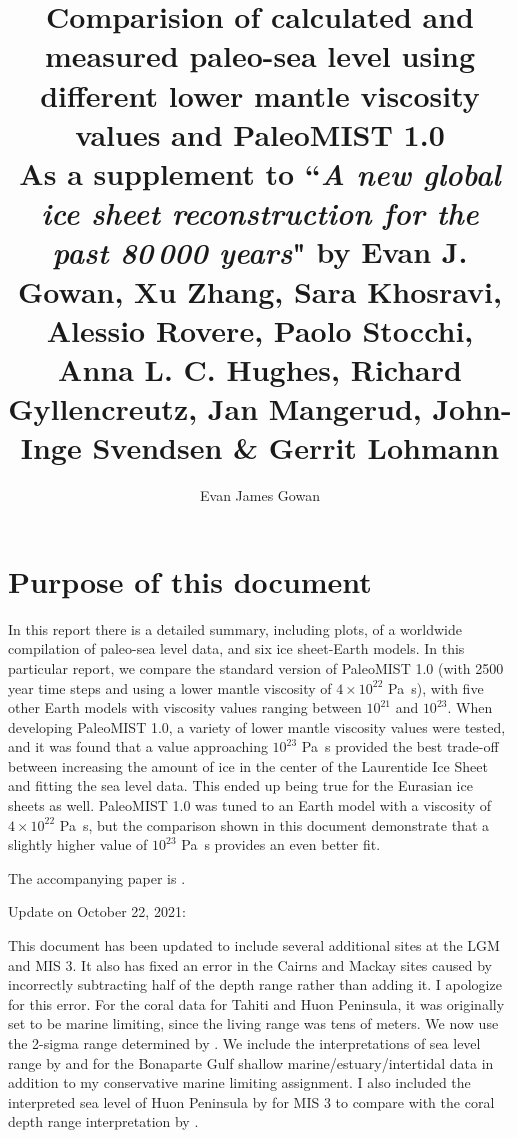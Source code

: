 \documentclass[a4paper,12pt]{article}
\begin{document}
\title{Comparision of calculated and measured paleo-sea level using different lower mantle viscosity values and PaleoMIST 1.0 \\
\normalsize As a supplement to ``\emph{A new global ice sheet reconstruction for the past 80\,000 years}" by Evan J. Gowan, Xu Zhang, Sara Khosravi, Alessio Rovere, Paolo Stocchi, Anna L. C. Hughes, Richard Gyllencreutz, Jan Mangerud, John-Inge Svendsen \& Gerrit Lohmann}

\author{Evan James Gowan}
    
\date{}

\maketitle

\tableofcontents

\newpage

\section{Purpose of this document}

In this report there is a detailed summary, including plots, of a worldwide compilation of paleo-sea level data, and six ice sheet-Earth models. In this particular report, we compare the standard version of PaleoMIST 1.0 (with 2500 year time steps and using a lower mantle viscosity of $4\times10^{22}$ Pa~s), with five other Earth models with viscosity values ranging between $10^{21}$ and $10^{23}$. When developing PaleoMIST 1.0, a variety of lower mantle viscosity values were tested, and it was found that a value approaching $10^{23}$ Pa~s provided the best trade-off between increasing the amount of ice in the center of the Laurentide Ice Sheet and fitting the sea level data. This ended up being true for the Eurasian ice sheets as well. PaleoMIST 1.0 was tuned to an Earth model with a viscosity of $4\times10^{22}$ Pa~s, but the comparison shown in this document demonstrate that a slightly higher value of $10^{23}$ Pa~s provides an even better fit.

The accompanying paper is \citep{GowanEtal2021b}.

Update on October 22, 2021:

This document has been updated to include several additional sites at the LGM and MIS 3. It also has fixed an error in the Cairns and Mackay sites caused by incorrectly subtracting half of the depth range rather than adding it. I apologize for this error. For the coral data for Tahiti and Huon Peninsula, it was originally set to be marine limiting, since the living range was tens of meters. We now use the 2-sigma range determined by \citet{HibbertEtal2016}. We include the interpretations of sea level range by \citet{IshiwaEtal2019} and \citet{YokoyamaEtal2000} for the Bonaparte Gulf shallow marine/estuary/intertidal data in addition to my conservative marine limiting assignment. I also included the interpreted sea level of Huon Peninsula by \citet{deGelderEtal2021} for MIS 3 to compare with the coral depth range interpretation by \citet{HibbertEtal2016}.
\end{document}
